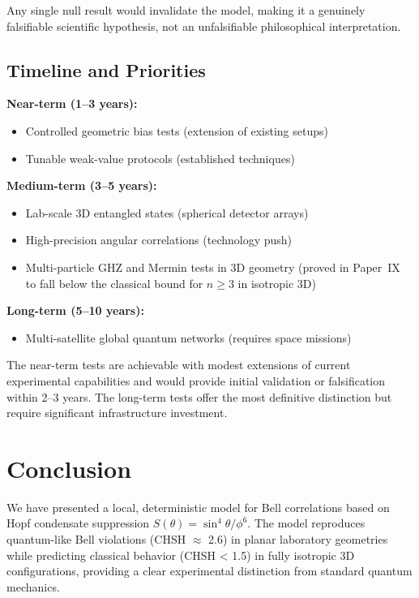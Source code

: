 \documentclass[11pt,a4paper]{article}
\theoremstyle{definition}
\theoremstyle{remark}
\begin{document}
Any single null result would invalidate the model, making it a genuinely falsifiable scientific hypothesis, not an unfalsifiable philosophical interpretation.

\subsection{Timeline and Priorities}

\textbf{Near-term (1--3 years):}
\begin{itemize}
\item Controlled geometric bias tests (extension of existing setups)
\item Tunable weak-value protocols (established techniques)
\end{itemize}

\textbf{Medium-term (3--5 years):}
\begin{itemize}
\item Lab-scale 3D entangled states (spherical detector arrays)
\item High-precision angular correlations (technology push)
\item Multi-particle GHZ and Mermin tests in 3D geometry (proved in Paper~IX~\cite{Paper9} to fall below the classical bound for $n\geq3$ in isotropic 3D)
\end{itemize}

\textbf{Long-term (5--10 years):}
\begin{itemize}
\item Multi-satellite global quantum networks (requires space missions)
\end{itemize}

The near-term tests are achievable with modest extensions of current experimental capabilities and would provide initial validation or falsification within 2--3 years. The long-term tests offer the most definitive distinction but require significant infrastructure investment.

\section{Conclusion}
\label{P8:sec:conclusion}

We have presented a local, deterministic model for Bell correlations based on Hopf condensate suppression $S(\theta) = \sin^4\theta/\phi^6$. The model reproduces quantum-like Bell violations (CHSH $\approx$ 2.6) in planar laboratory geometries while predicting classical behavior (CHSH < 1.5) in fully isotropic 3D configurations, providing a clear experimental distinction from standard quantum mechanics.
\end{document}
